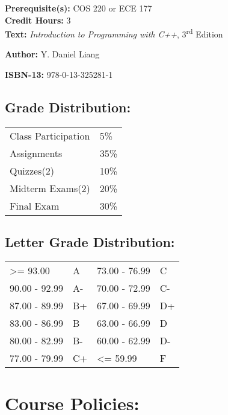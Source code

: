 \documentclass[11pt]{article}
\newcommand{\tf}[1]{%
  \large\textbf{#1}
}
\begin{document}
\tf{Prerequisite(s):} COS 220 or ECE 177 \\

\tf{Credit Hours:} 3 \\

\tf{Text:} \emph{Introduction to Programming with C++}, 3\textsuperscript{rd} Edition

\tf{Author:} Y. Daniel Liang

\tf{ISBN-13:} 978-0-13-325281-1

\subsection*{Grade Distribution:}
\label{sec:grades}

\begin{center}
  \begin{tabular}{ l l }
    Class Participation & 5\% \\
    Assignments & 35\% \\
    Quizzes(2)  & 10\% \\
    Midterm Exams(2)  & 20\% \\
    Final Exam  & 30\%
  \end{tabular}
\end{center}

\subsection*{Letter Grade Distribution:}
\label{sec:lettergrades}

\begin{center}
  \begin{tabular}{ l l | l l }
    \textgreater= 93.00 & A & 73.00 - 76.99 & C \\
    90.00 - 92.99 & A-  & 70.00 - 72.99 & C- \\
    87.00 - 89.99 & B+  & 67.00 - 69.99 & D+ \\
    83.00 - 86.99 & B  & 63.00 - 66.99 & D \\
    80.00 - 82.99 & B-  & 60.00 - 62.99 & D- \\
    77.00 - 79.99 & C+  & \textless= 59.99 & F \\
  \end{tabular}  
\end{center}

\section*{Course Policies:}
\label{sec:policies}
\end{document}

